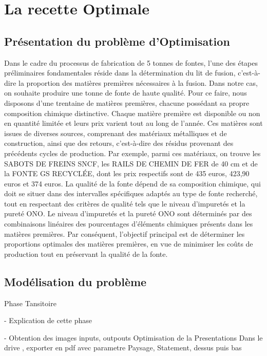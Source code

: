 \documentclass[12pt]{article}
\begin{document}
\section{La recette Optimale}

\subsection{Présentation du problème d'Optimisation }

Dans le cadre du processus de fabrication de 5 tonnes de fontes, l'une des étapes préliminaires fondamentales
réside dans la détermination du lit de fusion, c'est-à-dire la proportion des matières premières
nécessaires à la fusion. Dans notre cas, on souhaite  produire une tonne de fonte de haute qualité.
Pour ce faire, nous disposons d'une trentaine de matières premières, chacune possédant sa propre
composition chimique distinctive. Chaque matière première est disponible ou non en quantité limitée
et leurs prix varient tout au long de l'année. Ces matières sont issues de diverses sources,
comprenant des matériaux métalliques et de construction, ainsi que des retours, c'est-à-dire
des résidus provenant des précédents cycles de production. Par exemple, parmi ces matériaux,
on trouve les SABOTS DE FREINS SNCF, les RAILS DE CHEMIN DE FER de 40 cm et de la FONTE GS RECYCLÉE,
dont les prix respectifs sont de 435 euros, 423,90 euros et 374 euros. La qualité de la fonte dépend
de sa composition chimique, qui doit se situer dans des intervalles spécifiques adaptés au type
de fonte recherché, tout en respectant des critères de qualité tels que le niveau d'impuretés et
la pureté ONO. Le niveau d'impuretés et la pureté ONO sont déterminés par des combinaisons linéaires
des pourcentages d'éléments chimiques présents dans les matières premières. Par conséquent,
l'objectif principal est de déterminer les proportions optimales des matières premières,
en vue de minimiser les coûts de production tout en préservant la qualité de la fonte.


\subsection{Modélisation du problème}



Phase Tansitoire 

- Explication de cette phase 


- Obtention des images inputs, outpouts Optimisation de la Presentations
Dans le drive , exporter en pdf avec parametre Paysage, Statement, dessus puis bas
\end{document}
